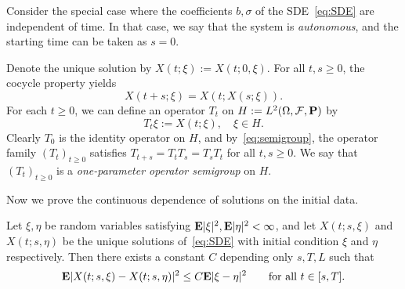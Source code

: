\begin{example}
	Consider the special case where the coefficients $b,\sigma$ of the SDE~\eqref{eq:SDE} are independent of time. In that case, we say that the system is \emph{autonomous}, and the starting time can be taken as $s=0$.
	
	Denote the unique solution by $X(t;\xi) := X(t;0,\xi)$. For all $t,s\ge 0$, the cocycle property yields
	\begin{equation}
		\label{eq:semigroup}
		X(t+s;\xi) = X(t;X(s;\xi)).
	\end{equation}
	For each $t\ge 0$, we can define an operator $T_t$ on $H:=L^2(\Omega,\mathcal{F},\mathbf{P})$ by
	\begin{equation*}
		T_t \xi := X(t;\xi), \quad\xi\in H.
	\end{equation*}
	Clearly $T_0$ is the identity operator on $H$, and by~\eqref{eq:semigroup}, the operator family $(T_t)_{t\ge 0}$ satisfies $T_{t+s}=T_t T_s = T_s T_t$ for all $t,s\ge 0$. We say that $(T_t)_{t\ge 0}$ is a \emph{one-parameter operator semigroup} on $H$.
\end{example}

Now we prove the continuous dependence of solutions on the initial data.
\begin{proposition}
	\label{prop:cont-dependence-initial}
	Let $\xi, \eta$ be random variables satisfying $\mathbf{E}|\xi|^2, \mathbf{E}|\eta|^2 < \infty$, and let $X(t;s,\xi)$ and $X(t;s,\eta)$ be the unique solutions of~\eqref{eq:SDE} with initial condition $\xi$ and $\eta$ respectively. Then there exists a constant $C$ depending only $s,T,L$ such that
	\begin{equation}
		\mathbf{E} |X(t;s,\xi) - X(t;s,\eta)|^2 \le C \mathbf{E}|\xi-\eta|^2 \qquad \text{for all } t \in [s, T].
	\end{equation}
\end{proposition}

